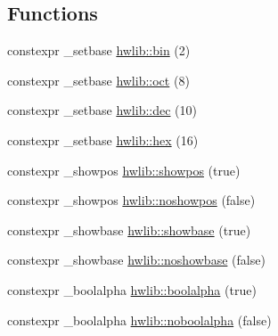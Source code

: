 \subsection*{Functions}
\begin{DoxyCompactItemize}
\item 
constexpr \+\_\+setbase \hyperlink{namespacehwlib_a2f624a643c9c8d30b5e4f3dca914e28e}{hwlib\+::bin} (2)
\item 
constexpr \+\_\+setbase \hyperlink{namespacehwlib_a9711974fb746e16a55e130b461cad619}{hwlib\+::oct} (8)
\item 
constexpr \+\_\+setbase \hyperlink{namespacehwlib_ab8f3a2357c88d53861c09dbd17f14f1b}{hwlib\+::dec} (10)
\item 
constexpr \+\_\+setbase \hyperlink{namespacehwlib_a4726c8f4bef5591b6f6853041328a04f}{hwlib\+::hex} (16)
\item 
constexpr \+\_\+showpos \hyperlink{namespacehwlib_a7bb9927f52011b4cc4a90b03e98f95fd}{hwlib\+::showpos} (true)
\item 
constexpr \+\_\+showpos \hyperlink{namespacehwlib_accdd72e1358d667a9458767d886b2a53}{hwlib\+::noshowpos} (false)
\item 
constexpr \+\_\+showbase \hyperlink{namespacehwlib_a84adb21b2d054d3b70c6b26af5f44566}{hwlib\+::showbase} (true)
\item 
constexpr \+\_\+showbase \hyperlink{namespacehwlib_af813ae25dc70ae85e2f06dcf81f8963b}{hwlib\+::noshowbase} (false)
\item 
constexpr \+\_\+boolalpha \hyperlink{namespacehwlib_a499e8cd6806e66c4c425b64c9512a21c}{hwlib\+::boolalpha} (true)
\item 
constexpr \+\_\+boolalpha \hyperlink{namespacehwlib_a6fe77cc67d9850cb262eb6e15e37724d}{hwlib\+::noboolalpha} (false)
\end{DoxyCompactItemize}
